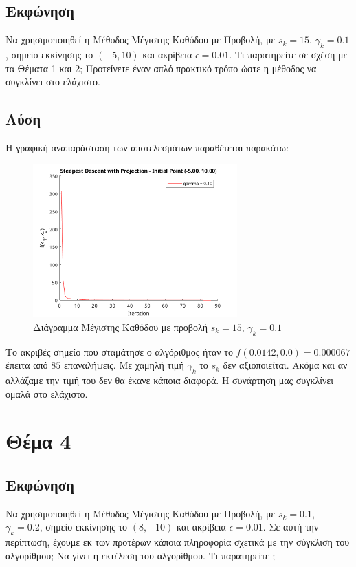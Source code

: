 \documentclass{report}
\begin{document}
\section{Εκφώνηση}
Να χρησιμοποιηθεί η Μέθοδος Μέγιστης Καθόδου με Προβολή, με $s_k = 15$, $\gamma_k = 0.1$,
σημείο εκκίνησης το $(-5,10)$ και ακρίβεια $\epsilon = 0.01$. Τι παρατηρείτε σε σχέση με τα Θέματα 1 
και 2; Προτείνετε έναν απλό πρακτικό τρόπο ώστε η 
μέθοδος να συγκλίνει στο ελάχιστο.

\section{Λύση}
Η γραφική αναπαράσταση των αποτελεσμάτων παραθέτεται παρακάτω:
\begin{figure}[H]
    \centering
    \includegraphics[width=0.7\textwidth]{media/thema3.png}
    \caption{Διάγραμμα Μέγιστης Καθόδου με προβολή $s_k = 15$, $\gamma_k = 0.1$}
\end{figure}
Το ακριβές σημείο που σταμάτησε ο αλγόριθμος ήταν το $f(0.0142, 0.0) = 0.000067$ έπειτα από
$85$ επαναλήψεις. Με χαμηλή τιμή $\gamma_k$ το $s_k$ δεν αξιοποιείται. Ακόμα και αν 
αλλάζαμε την τιμή του δεν θα έκανε κάποια διαφορά. Η συνάρτηση μας συγκλίνει ομαλά στο ελάχιστο.


\chapter{Θέμα 4}
\section{Εκφώνηση}
Να χρησιμοποιηθεί η Μέθοδος Μέγιστης Καθόδου με Προβολή, με $s_k = 0.1$, $\gamma_k = 0.2$,
σημείο εκκίνησης το $(8, -10)$ και ακρίβεια $\epsilon = 0.01$. Σε αυτή την περίπτωση, έχουμε εκ των
προτέρων κάποια πληροφορία σχετικά με την σύγκλιση του αλγορίθμου;
Να γίνει η εκτέλεση του αλγορίθμου. Τι παρατηρείτε
;
\end{document}

